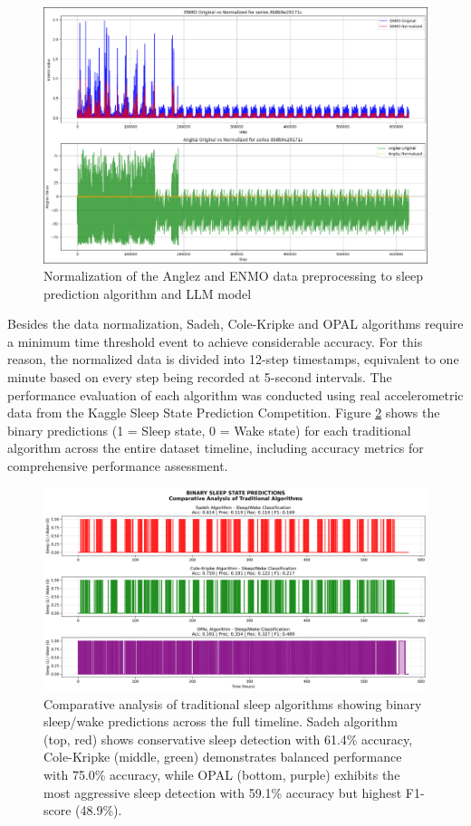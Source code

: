 \documentclass[conference]{IEEEtran}
\begin{document}
\begin{figure}[htbp]
	\centering
	\includegraphics[width=0.85\columnwidth]{data_normalizate.png}
	\caption{Normalization of the Anglez and ENMO data preprocessing to sleep prediction algorithm and LLM model }
	\label{fig:normalization of the Anglez and ENMO}
\end{figure}

Besides the data normalization, Sadeh, Cole-Kripke and OPAL algorithms require a minimum time threshold event to achieve considerable accuracy. For this reason, the normalized data is divided into 12-step timestamps, equivalent to one minute based on every step being recorded at 5-second intervals. The performance evaluation of each algorithm was conducted using real accelerometric data from the Kaggle Sleep State Prediction Competition. Figure \ref{fig:algorithms_comparison} shows the binary predictions (1 = Sleep state, 0 = Wake state) for each traditional algorithm across the entire dataset timeline, including accuracy metrics for comprehensive performance assessment.

\begin{figure}[htbp]
	\centering
	\includegraphics[width=0.95\columnwidth]{algorithms_comparison.png}
	\caption{Comparative analysis of traditional sleep algorithms showing binary sleep/wake predictions across the full timeline. Sadeh algorithm (top, red) shows conservative sleep detection with 61.4\% accuracy, Cole-Kripke (middle, green) demonstrates balanced performance with 75.0\% accuracy, while OPAL (bottom, purple) exhibits the most aggressive sleep detection with 59.1\% accuracy but highest F1-score (48.9\%).}
	\label{fig:algorithms_comparison}
\end{figure}
\end{document}

